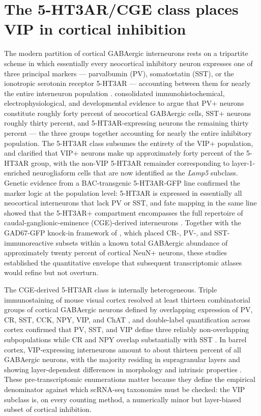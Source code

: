 \documentclass[11pt]{article}
\begin{document}
\section{The 5-HT3AR/CGE class places VIP in cortical inhibition}

The modern partition of cortical GABAergic interneurons rests on a tripartite scheme in which essentially every neocortical inhibitory neuron expresses one of three principal markers --- parvalbumin (PV), somatostatin (SST), or the ionotropic serotonin receptor 5-HT3AR --- accounting between them for nearly the entire interneuron population \citep{Rudy2011, Tremblay2016}. \citet{Rudy2011} consolidated immunohistochemical, electrophysiological, and developmental evidence to argue that PV+ neurons constitute roughly forty percent of neocortical GABAergic cells, SST+ neurons roughly thirty percent, and 5-HT3AR-expressing neurons the remaining thirty percent --- the three groups together accounting for nearly the entire inhibitory population. The 5-HT3AR class subsumes the entirety of the VIP+ population, and \citet{Tremblay2016} clarified that VIP+ neurons make up approximately forty percent of the 5-HT3AR group, with the non-VIP 5-HT3AR remainder corresponding to layer-1-enriched neurogliaform cells that are now identified as the \textit{Lamp5} subclass. Genetic evidence from a BAC-transgenic 5-HT3AR-GFP line confirmed the marker logic at the population level: 5-HT3AR is expressed in essentially all neocortical interneurons that lack PV or SST, and fate mapping in the same line showed that the 5-HT3AR+ compartment encompasses the full repertoire of caudal-ganglionic-eminence (CGE)-derived interneurons \citep{Lee2010}. Together with the GAD67-GFP knock-in framework of \citet{Tamamaki2003}, which placed CR-, PV-, and SST-immunoreactive subsets within a known total GABAergic abundance of approximately twenty percent of cortical NeuN+ neurons, these studies established the quantitative envelope that subsequent transcriptomic atlases would refine but not overturn.

The CGE-derived 5-HT3AR class is internally heterogeneous. Triple immunostaining of mouse visual cortex resolved at least thirteen combinatorial groups of cortical GABAergic neurons defined by overlapping expression of PV, CR, SST, CCK, NPY, VIP, and ChAT \citep{Gonchar2008}, and double-label quantification across cortex confirmed that PV, SST, and VIP define three reliably non-overlapping subpopulations while CR and NPY overlap substantially with SST \citep{Xu2010a}. In barrel cortex, VIP-expressing interneurons amount to about thirteen percent of all GABAergic neurons, with the majority residing in supragranular layers and showing layer-dependent differences in morphology and intrinsic properties \citep{Pronneke2015}. These pre-transcriptomic enumerations matter because they define the empirical denominator against which scRNA-seq taxonomies must be checked: the VIP subclass is, on every counting method, a numerically minor but layer-biased subset of cortical inhibition.
\end{document}
